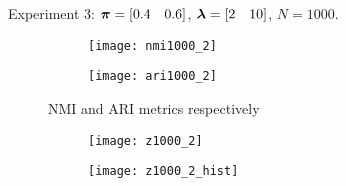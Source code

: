 \documentclass{article}
\begin{document}
\clearpage
Experiment 3: $\bm{\pi}=[0.4\quad 0.6]$, $\bm{\lambda}=[2\quad 10]$, $N=1000$.
\begin{figure}[h]
\centering
\begin{subfigure}{0.4\textwidth}
\texttt{[image: nmi1000\_2]}
\caption{}
\end{subfigure}
\begin{subfigure}{0.4\textwidth}
\texttt{[image: ari1000\_2]}
\caption{}
\end{subfigure}
\caption{NMI and ARI metrics respectively}
\label{fig:N1000}
\end{figure}
\begin{figure}[h]
\centering
\begin{subfigure}{0.4\textwidth}
\texttt{[image: z1000\_2]}
\caption{}
\end{subfigure}
\begin{subfigure}{0.4\textwidth}
\texttt{[image: z1000\_2\_hist]}
\caption{}
\end{subfigure}
\caption{}
\label{fig:z1000}
\end{figure}
\end{document}

